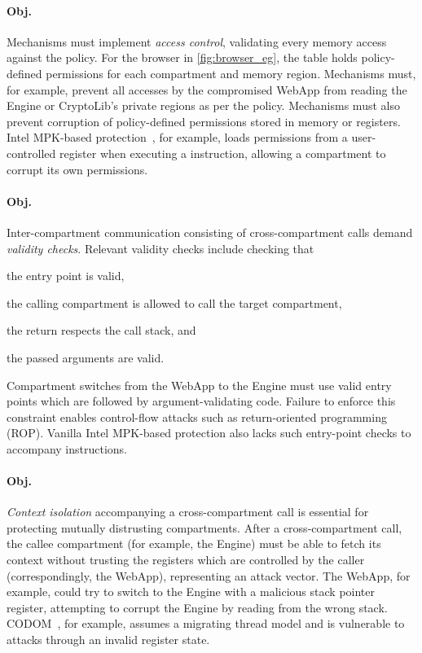 \paragraph{Obj. }
Mechanisms must implement \emph{access control},
validating every memory access against the policy.
For the browser in \autoref{fig:browser_eg}, the table
holds policy-defined permissions for each compartment and memory region.
Mechanisms must, for example, prevent all accesses by the compromised
WebApp from reading the Engine or CryptoLib's private regions as per the
policy.
Mechanisms must also prevent corruption of policy-defined permissions
stored in memory or registers.
Intel MPK-based protection~\cite{ParkLXMK19}, for example, loads
permissions from a user-controlled register when executing a
 instruction, allowing a compartment to corrupt its 
own permissions.

\paragraph{Obj. }
Inter-compartment communication consisting of cross-compartment calls 
demand \emph{validity checks}.
Relevant validity checks include checking that 
\begin{inparaenum}
  \item the entry point is valid,
  \item the calling compartment is allowed to call the target compartment, 
  \item the return respects the call stack, and
  \item the passed arguments are valid.
\end{inparaenum}
Compartment switches from the WebApp to the Engine must use valid entry
points which are followed by argument-validating code. Failure to enforce this
constraint enables
control-flow attacks such as return-oriented programming (ROP).
Vanilla Intel MPK-based protection also lacks such entry-point checks
to accompany  instructions.

\paragraph{Obj. }
\emph{Context isolation} accompanying a cross-compartment call is 
essential for protecting mutually distrusting compartments.
After a cross-compartment call, the callee compartment (for example, the Engine) 
must be able to fetch its context without trusting the registers which
are controlled by the caller (correspondingly, the WebApp), 
representing an attack vector.
The WebApp, for example, could try to switch to the Engine with a malicious stack pointer
register, attempting to corrupt the Engine by reading from the wrong stack.
CODOM~\cite{VilanovaBNEV14}, for example, assumes a migrating thread model
and is vulnerable to attacks through an invalid register state.

